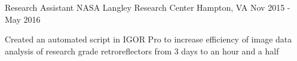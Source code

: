 \begin{cventries}
  \cventry
    {Research Assistant} %
    {NASA Langley Research Center} %
    {Hampton, VA} %
    {Nov 2015 - May 2016} %
    {
      \begin{cvitems} %
        \item {Created an automated script in IGOR Pro to increase efficiency of image data analysis of research grade retroreflectors from 3 days to an hour and a half}
      \end{cvitems}
    }
\end{cventries}
